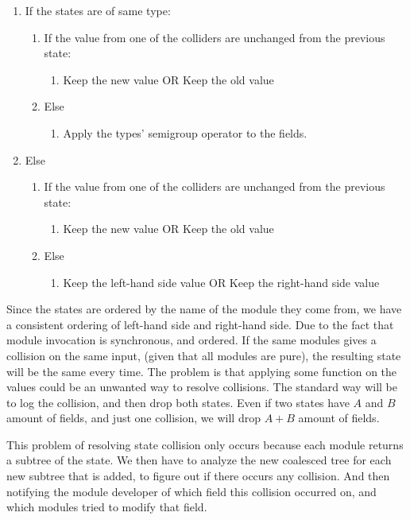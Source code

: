 \begin{enumerate}
  \item If the states are of same type:
    \begin{enumerate}
      \item If the value from one of the colliders are unchanged from the previous state:
        \begin{enumerate}
          \item Keep the new value OR Keep the old value
        \end{enumerate}
      \item Else
        \begin{enumerate}
          \item Apply the types' semigroup operator to the fields.
        \end{enumerate}
    \end{enumerate}
  \item Else
    \begin{enumerate}
      \item If the value from one of the colliders are unchanged from the previous state:
        \begin{enumerate}
          \item Keep the new value OR Keep the old value
        \end{enumerate}
      \item Else
        \begin{enumerate}
          \item Keep the left-hand side value OR Keep the right-hand side value
        \end{enumerate}
    \end{enumerate}
\end{enumerate}

Since the states are ordered by the name of the module they come from, we
have a consistent ordering of left-hand side and right-hand side. Due to the
fact that module invocation is synchronous, and ordered. If the same modules
gives a collision on the same input, (given that all modules are pure), the
resulting state will be the same every time. The problem is that applying some
function on the values could be an unwanted way to resolve collisions. The
standard way will be to log the collision, and then drop both states. Even
if two states have $A$ and $B$ amount of fields, and just one collision, we will
drop $A + B$ amount of fields.

This problem of resolving state collision only occurs because each module
returns a subtree of the state. We then have to analyze the new coalesced tree
for each new subtree that is added, to figure out if there occurs any collision.
And then notifying the module developer of which field this collision occurred
on, and which modules tried to modify that field.

